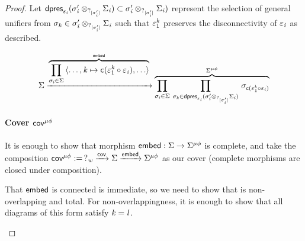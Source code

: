 \begin{proof}
    Let $\mathsf{dpres}_{\varepsilon_{\mathit{i}}}(\sigma_{\mathit{i}}' \otimes_{?_{[\sigma_{\mathit{i}}']}} \Sigma_{\mathit{i}}) \subset \sigma_{\mathit{i}}' \otimes_{?_{[\sigma_{\mathit{i}}']}} \Sigma_{\mathit{i}})$
    represent the selection of general unifiers from $\sigma_{\mathit{k}} \in \sigma_{\mathit{i}}' \otimes_{?_{[\sigma_{\mathit{i}}']}} \Sigma_{\mathit{i}}$ such that $\varepsilon^{\mathit{k}}_1$ preserves the disconnectivity of $\varepsilon_{\mathit{i}}$ as described.

    \begin{align*}
        \Sigma 
            \xrightarrow{\overbrace{\prod_{\sigma_{\mathit{i}} \in \Sigma}\, \langle \hdots, \mathit{k} \mapsto \mathsf{c}(\varepsilon^{\mathit{k}}_1 \circ \varepsilon_{\mathit{i}}), \hdots \rangle}^{\mathsf{embed}}}
        \overbrace{
            \prod_{\sigma_{\mathit{i}} \in \Sigma}\, \prod_{\sigma_{\mathit{k}} \in \mathsf{dpres}_{\varepsilon_{\mathit{i}}}(\sigma_{\mathit{i}}' \otimes_{?_{[\sigma_{\mathit{i}}']}} \Sigma_{\mathit{i}})}\,\sigma_{\mathsf{c}(\varepsilon^{\mathit{k}}_1 \circ \varepsilon_{\mathit{i}})}
        }^{\Sigma^{\mu\phi}} 
    \end{align*}

\paragraph{Cover $\mathsf{cov}^{\mu\phi}$}
    It is enough to show that morphism $\mathsf{embed} : \Sigma \to \Sigma^{\mu\phi}$ is complete, 
    and take the composition $\mathsf{cov}^{\mu\phi} :=\, ?_{\mathit{w}} \xrightarrow{\mathsf{cov}} \Sigma \xrightarrow{\mathsf{embed}} \Sigma^{\mu\phi}$ as our cover (complete morphisms are closed under composition).

    That $\mathsf{embed}$ is connected is immediate, so we need to show that is non-overlapping and total.
    For non-overlappingness, it is enough to show that all diagrams of this form satisfy $\mathit{k} = \mathit{l}$.
    \begin{center}
    \end{center}


\end{proof}
